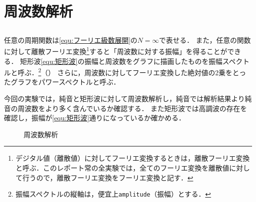 \chapter{周波数解析}
\section{\kadaiba}\label{sec:\kadaiba}
\purpose
任意の周期関数は\eqref{equ:フーリエ級数展開}の\(N=\infty\)で表せる．
また，任意の関数に対して離散フーリエ変換\footnote{デジタル値（離散値）に対してフーリエ変換するときは，離散フーリエ変換と呼ぶ．このレポート常の全実験では，全てのフーリエ変換を離散値に対して行うので，離散フーリエ変換をフーリエ変換と記す．}すると「周波数に対する振幅」を得ることができる．
矩形波\eqref{equ:矩形波}の振幅と周波数をグラフに描画したものを振幅スペクトルと呼ぶ．\footnote{振幅スペクトルの縦軸は，便宜上\texttt{amplitude}（振幅）とする．}（）
さらに，周波数に対してフーリエ変換した絶対値の2乗をとったグラフをパワースペクトルと呼ぶ．\par
今回の実験では，純音と矩形波に対して周波数解析し，純音では解析結果より純音の周波数をより多く含んでいるか確認する．
また矩形波では高調波の存在を確認し，振幅が\eqref{equ:矩形波}通りになっているか確かめる．
\begin{figure}[H]
    \centering
    \begin{minipage}{.48\textwidth}
        \centering
        
    \end{minipage}
    \begin{minipage}{.48\textwidth}
        \centering
        \scalebox{0.8}{}
    \end{minipage}
    \caption{周波数解析}
    \label{fig:周波数解析}
\end{figure}
\method
